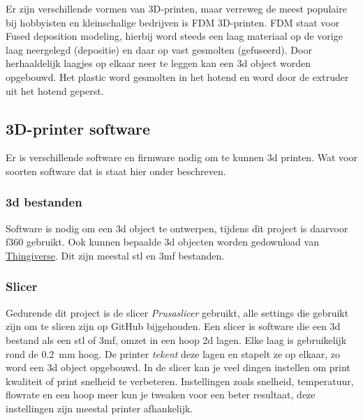 Er zijn verschillende vormen van 3D-printen, maar verreweg de meest populaire
bij hobbyisten en kleinschalige bedrijven is FDM 3D-printen. FDM staat voor
Fused deposition modeling, hierbij word steeds een laag materiaal op de vorige
laag neergelegd (depositie) en daar op vast gesmolten (gefuseerd). Door
herhaaldelijk laagjes op elkaar neer te leggen kan een \ac{3d} object worden
opgebouwd. Het plastic word gesmolten in het hotend en word door de extruder
uit het hotend geperst.

\subsection{3D-printer software}

Er is verschillende software en firmware nodig om te kunnen 3d printen. Wat
voor soorten software dat is staat hier onder beschreven.

\subsubsection{\ac{3d} bestanden}

Software is nodig om een 3d object te ontwerpen, tijdens dit project is
daarvoor \ac{f360} gebruikt. Ook kunnen bepaalde \ac{3d} objecten worden
gedownload van \href{https://www.thingiverse.com}{Thingiverse}. Dit zijn
meestal \ac{stl} en \ac{3mf} bestanden.

\subsubsection{Slicer}

Gedurende dit project is de slicer \emph{Prusaslicer} gebruikt, alle settings
die gebruikt zijn om te slicen zijn op GitHub bijgehouden.  Een slicer is
software die een \ac{3d} bestand als een \ac{stl} of \ac{3mf}, omzet in een
hoop \ac{2d} lagen. Elke laag is gebruikelijk rond de \SI{0.2}{\milli\meter}
hoog. De printer \emph{tekent} deze lagen en stapelt ze op elkaar, zo word een
\ac{3d} object opgebouwd. In de slicer kan je veel dingen instellen om print
kwaliteit of print snelheid te verbeteren. Instellingen zoals snelheid,
temperatuur, flowrate en een hoop meer kun je tweaken voor een beter resultaat,
deze instellingen zijn meestal printer afhankelijk.

